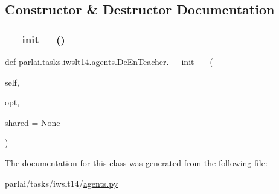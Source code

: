 \subsection{Constructor \& Destructor Documentation}
\mbox{\label{classparlai_1_1tasks_1_1iwslt14_1_1agents_1_1DeEnTeacher_a1b0090df254e8af7cc6b0073362a400d}} 
\subsubsection{\texorpdfstring{\+\_\+\+\_\+init\+\_\+\+\_\+()}{\_\_init\_\_()}}
{\footnotesize\ttfamily def parlai.\+tasks.\+iwslt14.\+agents.\+De\+En\+Teacher.\+\_\+\+\_\+init\+\_\+\+\_\+ (\begin{DoxyParamCaption}\item[{}]{self,  }\item[{}]{opt,  }\item[{}]{shared = {\ttfamily None} }\end{DoxyParamCaption})}



The documentation for this class was generated from the following file\+:\begin{DoxyCompactItemize}
\item 
parlai/tasks/iwslt14/\hyperlink{parlai_2tasks_2iwslt14_2agents_8py}{agents.\+py}\end{DoxyCompactItemize}
